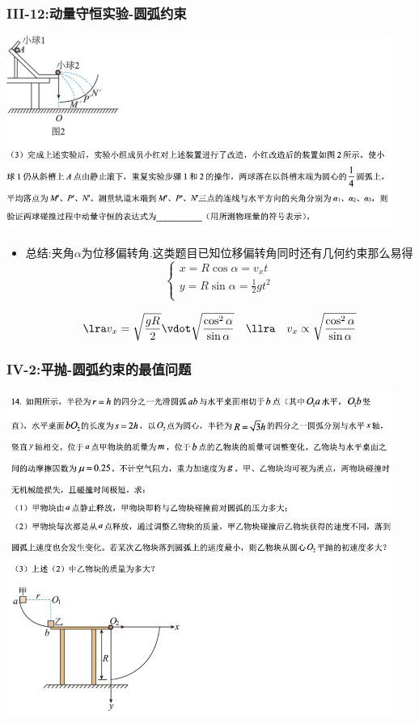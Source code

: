 \documentclass{article}
\begin{document}
\vspace{2em}

\subsubsection{III-12:动量守恒实验-圆弧约束}
\includegraphics[width=0.95\textwidth,keepaspectratio]{./pictures/1.2-4.png}

\begin{itemize}
    \item 总结:夹角$\alpha$为位移偏转角.这类题目已知位移偏转角同时还有几何约束那么易得
          $$
              \begin{cases}
                  x = R \cos{\alpha} = v_{x} t             \\
                  y = R \sin{\alpha} = \frac{1}{2} g t^{2} \\
              \end{cases}
          $$

          $$
              \lra v_{x} = \sqrt{\frac{gR}{2}} \vdot \sqrt{\frac{\cos^{2}{\alpha}}{\sin{\alpha}}} \quad  \llra \quad  v_{x}  \propto  \sqrt{\frac{\cos^{2}{\alpha}}{\sin{\alpha}}}
          $$

\end{itemize}

\vspace{2em}

\subsubsection{IV-2:平抛-圆弧约束的最值问题}
\includegraphics[width=0.95\textwidth,keepaspectratio]{./pictures/1.2-6.png}
\end{document}
